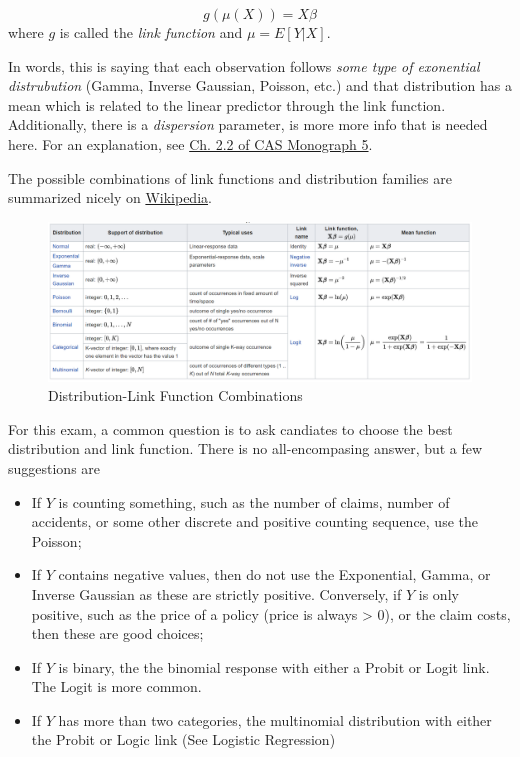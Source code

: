 \documentclass[openany]{book}
\providecommand{\tightlist}{%
  \setlength{\itemsep}{0pt}\setlength{\parskip}{0pt}}
\begin{document}
\[g(\mu(X)) = X\beta\]
where \(g\) is called the \emph{link function} and \(\mu = E[Y|X]\).

In words, this is saying that each observation follows \emph{some type of exonential distrubution} (Gamma, Inverse Gaussian, Poisson, etc.) and that distribution has a mean which is related to the linear predictor through the link function. Additionally, there is a \emph{dispersion} parameter, is more more info that is needed here. For an explanation, see \href{https://www.casact.org/pubs/monographs/papers/05-Goldburd-Khare-Tevet.pdf}{Ch. 2.2 of CAS Monograph 5}.

The possible combinations of link functions and distribution families are summarized nicely on \href{https://en.wikipedia.org/wiki/Generalized_linear_model\#Link_function}{Wikipedia}.

\begin{figure}
\includegraphics[width=22.32in]{images/glm_links} \caption{Distribution-Link Function Combinations}\label{fig:unnamed-chunk-14}
\end{figure}

For this exam, a common question is to ask candiates to choose the best distribution and link function. There is no all-encompasing answer, but a few suggestions are

\begin{itemize}
\tightlist
\item
  If \(Y\) is counting something, such as the number of claims, number of accidents, or some other discrete and positive counting sequence, use the Poisson;
\item
  If \(Y\) contains negative values, then do not use the Exponential, Gamma, or Inverse Gaussian as these are strictly positive. Conversely, if \(Y\) is only positive, such as the price of a policy (price is always \textgreater{} 0), or the claim costs, then these are good choices;
\item
  If \(Y\) is binary, the the binomial response with either a Probit or Logit link. The Logit is more common.
\item
  If \(Y\) has more than two categories, the multinomial distribution with either the Probit or Logic link (See Logistic Regression)
\end{itemize}
\end{document}
